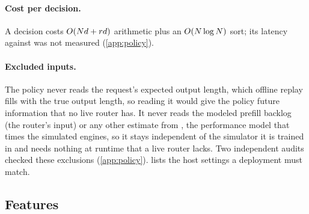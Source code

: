 \paragraph{Cost per decision.}
A decision costs $O(Nd + rd)$ arithmetic plus an $O(N\log N)$ sort; its
latency against  was not measured (\cref{app:policy}).

\paragraph{Excluded inputs.}
The policy never reads the request's expected output length, which offline replay fills with the
true output length, so reading it would give the policy future information that no live router
has. It never reads the modeled prefill backlog (the router's  input) or any
other estimate from \ais{}, the performance model that times the simulated engines, so it stays
independent of the simulator it is trained in and needs nothing at runtime that a live router
lacks. Two independent audits checked these exclusions (\cref{app:policy}).
 lists the host settings a deployment must match.

\subsection{Features}
\label{sec:features}

